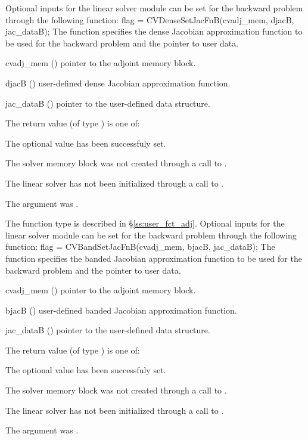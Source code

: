 Optional inputs for the {\cvdense} linear solver module can be set for the backward
problem through the following function:
{
  flag = CVDenseSetJacFnB(cvadj\_mem, djacB, jac\_dataB);
}
{
  The function  specifies the dense Jacobian
  approximation function to be used for the backward problem and the
  pointer to user data.
}
{
  \begin{args}
  \item[cvadj\_mem] ()
    pointer to the adjoint memory block.
  \item[djacB] ()
    user-defined dense Jacobian approximation function.
  \item[jac\_dataB] ()
    pointer to the user-defined data structure.
  \end{args}
}
{
  The return value  (of type ) is one of:
  \begin{args}
  \item[\Id{CVDENSE\_SUCCESS}] 
    The optional value has been successfuly set.
  \item[\Id{CVDENSE\_MEM\_NULL}]
    The {\cvodes} solver memory block was not created through a call to .
  \item[\Id{CVDENSE\_LMEM\_NULL}]
    The {\cvdense} linear solver has not been initialized through a call to .
  \item[\Id{CV\_ADJMEM\_NULL}]
    The  argument was .
  \end{args}
}
{
  The function type  is described in \S\ref{ss:user_fct_adj}.
}
Optional inputs for the {\cvband} linear solver module can be set for the backward
problem through the following function:
{
  flag = CVBandSetJacFnB(cvadj\_mem, bjacB, jac\_dataB);
}
{
  The function  specifies the banded Jacobian
  approximation function to be used for the backward problem and the
  pointer to user data.
}
{
  \begin{args}
  \item[cvadj\_mem] ()
    pointer to the adjoint memory block.
  \item[bjacB] ()
    user-defined banded Jacobian approximation function.
  \item[jac\_dataB] ()
    pointer to the user-defined data structure.
  \end{args}
}
{
  The return value  (of type ) is one of:
  \begin{args}
  \item[\Id{CVBAND\_SUCCESS}] 
    The optional value has been successfuly set.
  \item[\Id{CVBAND\_MEM\_NULL}]
    The {\cvodes} solver memory block was not created through a call to .
  \item[\Id{CVBAND\_LMEM\_NULL}]
    The {\cvband} linear solver has not been initialized through a call to .
  \item[\Id{CV\_ADJMEM\_NULL}]
    The  argument was .
  \end{args}
}
